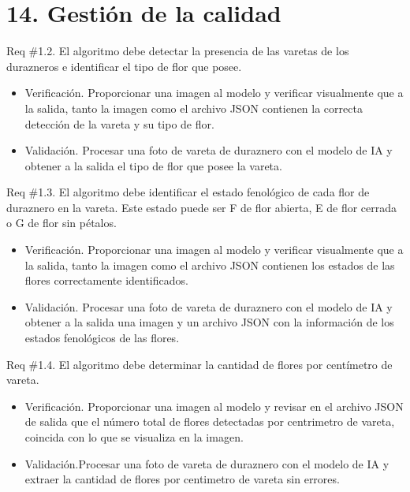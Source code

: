 \documentclass[
11pt, %
]{charter}
\begin{document}
\section{14. Gestión de la calidad}
\label{sec:calidad}

Req \#1.2. El algoritmo debe detectar la presencia de las varetas de los durazneros e identificar el tipo de flor que posee.

\begin{itemize}
	\item Verificación. Proporcionar una imagen al modelo y verificar visualmente  que a la salida, tanto la imagen como el archivo JSON contienen la correcta detección de la vareta y su tipo de flor.
	
	\item Validación. Procesar una foto de vareta de duraznero con el modelo de IA y obtener a la salida el tipo de flor que posee la vareta. 
\end{itemize}

Req \#1.3. El algoritmo debe identificar el estado fenológico de cada flor de duraznero en la vareta. Este estado puede ser F de flor abierta, E de flor cerrada o G de flor sin pétalos.

\begin{itemize}
	\item Verificación. Proporcionar una imagen al modelo y verificar visualmente  que a la salida, tanto la imagen como el archivo JSON contienen los estados de las flores correctamente identificados.
	
	\item Validación. Procesar una foto de vareta de duraznero con el modelo de IA y obtener a la salida una imagen y un archivo JSON con la información de los estados fenológicos de las flores. 
\end{itemize}

Req \#1.4. El algoritmo debe determinar la cantidad de flores por centímetro de vareta.

\begin{itemize}
	\item Verificación. Proporcionar una imagen al modelo y revisar en el archivo JSON de salida que el número total de flores detectadas por centrimetro de vareta, coincida con lo que se visualiza en la imagen.
	
	\item Validación.Procesar una foto de vareta de duraznero con el modelo de IA y extraer la cantidad de flores por centimetro de vareta sin errores. 
\end{itemize}
\end{document}
